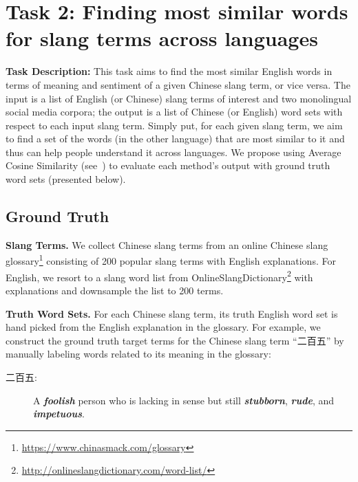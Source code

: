 \section{Task 2: Finding most similar words for slang terms across languages}
\label{sec:bleis}
\textbf{Task Description:} This task aims to find the most similar English words in terms of meaning and sentiment of a given Chinese slang term, or vice versa. The input is a list of English (or Chinese) slang terms of interest and two monolingual social media corpora; the output is a list of Chinese (or English) word sets with respect to each input slang term.
Simply put, for each given slang term, we aim to find a set of the words (in the other language) that are most similar to it and thus can help people understand it across languages.
We propose using Average Cosine Similarity (see~) to evaluate each method's output with ground truth word sets (presented below).

\subsection{Ground Truth}
\label{sec:ground}
\textbf{Slang Terms.}
We collect Chinese slang terms from an online Chinese slang glossary\footnote{\scriptsize{\url{https://www.chinasmack.com/glossary}}} consisting of 200 popular slang terms with English explanations. 
For English, we resort to a slang word list from OnlineSlangDictionary\footnote{\scriptsize{\url{http://onlineslangdictionary.com/word-list/}}} with explanations and downsample the list to 200 terms.

\noindent
\textbf{Truth Word Sets.}
For each Chinese slang term, its truth English word set is hand picked from the English explanation in the glossary. 
For example, we construct the ground truth target terms for 
the Chinese slang term ``二百五'' by manually labeling words related to its meaning in the glossary: 
\begin{description}
	\item[二百五:] A \textbf{\textit{foolish}} person who is lacking in sense but still \textbf{\textit{stubborn}}, \textbf{\textit{rude}}, and \textbf{\textit{impetuous}}.
\end{description}

